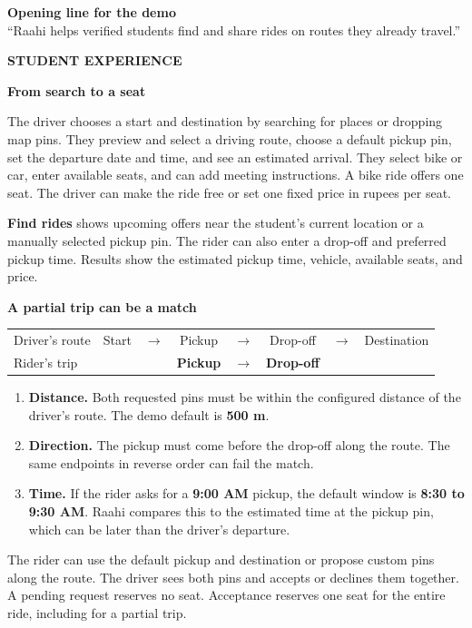 \documentclass[11pt,a4paper]{article}
\newcommand{\kicker}[1]{{\small\bfseries\textcolor{Pine}{\MakeUppercase{#1}}}\par}
\newcommand{\pageheading}[2]{%
  \pdfbookmark[0]{#2}{guide-page-\thepage}%
  \kicker{#1}%
  {\fontsize{31}{35}\selectfont\bfseries\textcolor{Ink}{#2}\par}%
  \vspace{2pt}%
}
\newcommand{\subhead}[1]{\par\addvspace{8pt}{\large\bfseries\textcolor{Pine}{#1}}\par\nopagebreak[4]}
\newcommand{\panel}[1]{%
  \par\noindent\colorbox{Wash}{\parbox{\dimexpr\linewidth-2\fboxsep\relax}{\setlength{\parskip}{4pt}#1}}\par
}
\begin{document}
\panel{\textbf{Opening line for the demo}\\
\textquotedblleft Raahi helps verified students find and share rides on routes they already travel.\textquotedblright}

\newpage
\pageheading{Student experience}{From search to a seat}

\subhead{Offer a ride}
The driver chooses a start and destination by searching for places or dropping map pins. They preview and select a driving route, choose a default pickup pin, set the departure date and time, and see an estimated arrival. They select bike or car, enter available seats, and can add meeting instructions. A bike ride offers one seat. The driver can make the ride free or set one fixed price in rupees per seat.

\subhead{Find a ride}
\textbf{Find rides} shows upcoming offers near the student's current location or a manually selected pickup pin. The rider can also enter a drop-off and preferred pickup time. Results show the estimated pickup time, vehicle, available seats, and price.

\panel{\textbf{A partial trip can be a match}\par
\setlength{\tabcolsep}{4pt}
\begin{tabular}{@{}lccccccc@{}}
Driver's route & Start & \(\rightarrow\) & Pickup & \(\rightarrow\) & Drop-off & \(\rightarrow\) & Destination \\
Rider's trip & & & \bfseries Pickup & \(\rightarrow\) & \bfseries Drop-off & & \\
\end{tabular}}

\subhead{What makes a match}
\begin{enumerate}
  \item \textbf{Distance.} Both requested pins must be within the configured distance of the driver's route. The demo default is \textbf{500 m}.
  \item \textbf{Direction.} The pickup must come before the drop-off along the route. The same endpoints in reverse order can fail the match.
  \item \textbf{Time.} If the rider asks for a \textbf{9:00 AM} pickup, the default window is \textbf{8:30 to 9:30 AM}. Raahi compares this to the estimated time at the pickup pin, which can be later than the driver's departure.
\end{enumerate}

\subhead{Request, review, and confirm}
The rider can use the default pickup and destination or propose custom pins along the route. The driver sees both pins and accepts or declines them together. A pending request reserves no seat. Acceptance reserves one seat for the entire ride, including for a partial trip.
\end{document}
